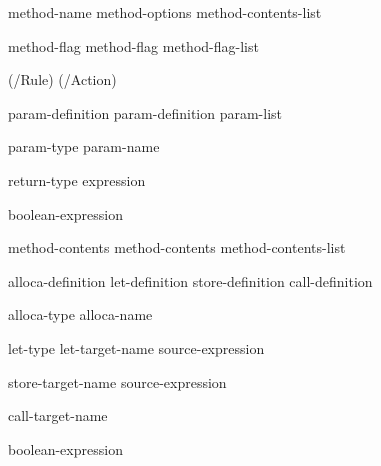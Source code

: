\begin{bnf}
\br
     method-name method-options \terminal{\{} method-contents-list \terminal{\}}

\br
       

\br
    method-flag\br
    method-flag method-flag-list

\br
    \terminal(/Rule)\br
    \terminal(/Action)

\br
    param-definition\br
    param-definition \terminal{,} param-list

\br
    param-type param-name

\br
    return-type \terminal{=} expression

\br
     boolean-expression

\br
    method-contents\br
    method-contents method-contents-list

\br
    alloca-definition\br
    let-definition\br
    store-definition\br
    call-definition

\br
     alloca-type alloca-name

\br
     let-type  \terminal{:} let-target-name \terminal{=} source-expression

\br
      \terminal{:} store-target-name \terminal{=} source-expression

\br
       \terminal{:} call-target-name 

\br
    \terminal{(} boolean-expression \terminal{)}

\end{bnf}
